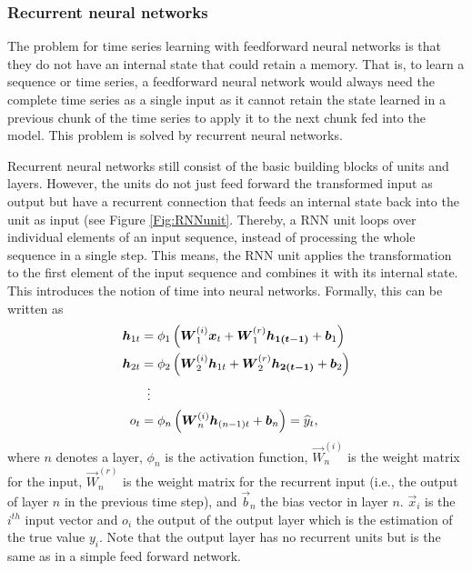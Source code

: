 \subsubsection{Recurrent neural networks}

The problem for time series learning with feedforward neural networks is that they do not have an internal state that could retain a memory. That is, to learn a sequence or time series, a feedforward neural network would always need the complete time series as a single input as it cannot retain the state learned in a previous chunk of the time series to apply it to the next chunk fed into the model. This problem is solved by recurrent neural networks.

Recurrent neural networks still consist of the basic building blocks of units and layers. However, the units do not just feed forward the transformed input as output but have a recurrent connection that feeds an internal state back into the unit as input (see Figure \ref{Fig:RNNunit}. Thereby, a RNN unit loops over individual elements of an input sequence, instead of processing the whole sequence in a single step. This means, the RNN unit applies the transformation to the first element of the input sequence and combines it with its internal state. This introduces the notion of time into neural networks. Formally, this can be written as
%
\begin{equation} \label{RNN}
\begin{split}
    \vec{h}_{1t}&=\phi_1\left(\vec{W}_1^{(i)}\vec{x}_t+\vec{W}^{(r)}_1\vec{h_{1(t-1)}}+\vec{b}_1\right)\\
    \vec{h}_{2t}&=\phi_2\left(\vec{W}_2^{(i)}\vec{h}_{1t}+\vec{W}^{(r)}_2\vec{h_{2(t-1)}}+\vec{b}_2\right)\\
    &\setbox0\hbox{=}\mathrel{\makebox[\wd0]{\hfil\vdots\hfil}}\\
    o_t&=\phi_n\left(\vec{W}_n^{(i)}\vec{h}_{(n-1)t}+\vec{b}_n\right)=\widehat{y}_t,
\end{split}
\end{equation}
%
where $n$ denotes a layer, $\phi_n$ is the activation function, $\vec{W}_n^{(i)}$ is the weight matrix for the input, $\vec{W}_n^{(r)}$ is the weight matrix for the recurrent input (i.e., the output of layer $n$ in the previous time step), and $\vec{b}_n$ the bias vector in layer $n$. $\vec{x}_i$ is the $i^{th}$ input vector and $o_i$ the output of the output layer which is the estimation of the true value $y_i$. Note that the output layer has no recurrent units but is the same as in a simple feed forward network.
